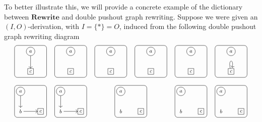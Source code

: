 \documentclass[11pt]{amsart}
\newcommand{\cat}[1]{\mathbf{#1}}
\theoremstyle{remark}
\theoremstyle{definition}
\begin{document}
To better illustrate this, we will provide a concrete example of the dictionary between $\cat{Rewrite}$ and double pushout graph rewriting.  Suppose we were given an $(I,O)$-derivation, with $I=\{\ast\}=O$, induced from the following double pushout graph rewriting diagram
\[
\begin{tikzpicture} 
	\draw[rounded corners] (-0.3,1.7) rectangle (1.3,3.3);
	\draw[rounded corners] (1.7,1.7) rectangle (3.3,3.3);
	\draw[rounded corners] (3.7,1.7) rectangle (5.3,3.3);
	\draw[rounded corners] (5.7,1.7) rectangle (7.3,3.3);
	\draw[rounded corners] (7.7,1.7) rectangle (9.3,3.3);
	\draw[rounded corners] (9.7,1.7) rectangle (11.3,3.3);
	\draw[rounded corners] (-0.3,-0.3) rectangle (1.3,1.3);
	\draw[rounded corners] (1.7,-0.3) rectangle (3.3,1.3);
	\draw[rounded corners] (4.7,-0.3) rectangle (6.3,1.3);
	\draw[rounded corners] (7.7,-0.3) rectangle (9.3,1.3);
	\draw[rounded corners] (9.7,-0.3) rectangle (11.3,1.3);
	\node[draw,circle,scale=0.75] (a1) at (0.5,3) {$a$};
	\node[draw,rectangle,scale=0.75] (c1) at (0.5,2) {$c$};
	\node[draw,circle,scale=0.75] (a2) at (2.5,3) {$a$};
	\node[draw,rectangle,scale=0.75] (c2) at (2.5,2) {$c$};
	\node[draw,circle,scale=0.75] (a3) at (4.5,3) {$a$};
	\node[draw,rectangle,scale=0.75] (c3) at (4.5,2) {$c$};
	\node[draw,circle,scale=0.75] (a4) at (6.5,3) {$a$};
	\node[draw,rectangle,scale=0.75] (c4) at (6.5,2) {$c$};
	\node[draw,circle,scale=0.75] (a5) at (8.5,3) {$a$};
	\node[draw,rectangle,scale=0.75] (c5) at (8.5,2) {$c$};
	\node[draw,circle,scale=0.75] (a6) at (10.5,3) {$a$};
	\node[draw,rectangle,scale=0.75] (c6) at (10.5,2) {$c$};
	\node[draw,circle,scale=0.75] (a7) at (0,1) {$a$};
	\node[scale=0.75] (b1) at (0,0) {$b$};
	\node[draw,rectangle,scale=0.75] (c7) at (1,0) {$c$};
	\node[draw,circle,scale=0.75] (a8) at (2,1) {$a$};
	\node[scale=0.75] (b2) at (2,0) {$b$};
	\node[draw,rectangle,scale=0.75] (c8) at (3,0) {$c$};
	\node[draw,circle,scale=0.75] (a9) at (5,1) {$a$};
	\node[scale=0.75] (b3) at (5,0) {$b$};
	\node[draw,rectangle,scale=0.75] (c9) at (6,0) {$c$};
	\node[draw,circle,scale=0.75] (a10) at (8,1) {$a$};
	\node[scale=0.75] (b4) at (8,0) {$b$};
	\node[draw,rectangle,scale=0.75] (c10) at (9,0) {$c$};
	\node[draw,circle,scale=0.75] (a11) at (10,1) {$a$};
	\node[scale=0.75] (b5) at (10,0) {$b$};
	\node[draw,rectangle,scale=0.75] (c11) at (11,0) {$c$};
	\draw [->] (a1) -- (c1);
	\draw (c6) edge [loop above] (c6);
	\draw [->] (a7) -- (b1);
	\draw [->] (b1) -- (c7);
	\draw [->] (a8) -- (b2);
	\draw [->] (b2) -- (c8);

\end{tikzpicture}\]
\end{document}
